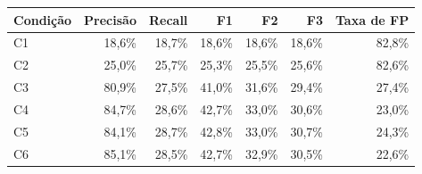 \begin{tabular}{lrrrrrr}
\hline
Condição & Precisão & Recall & F1 & F2 & F3 & Taxa de FP \\
\hline
C1 & 18,6\% & 18,7\% & 18,6\% & 18,6\% & 18,6\% & 82,8\% \\
C2 & 25,0\% & 25,7\% & 25,3\% & 25,5\% & 25,6\% & 82,6\% \\
C3 & 80,9\% & 27,5\% & 41,0\% & 31,6\% & 29,4\% & 27,4\% \\
C4 & 84,7\% & 28,6\% & 42,7\% & 33,0\% & 30,6\% & 23,0\% \\
C5 & 84,1\% & 28,7\% & 42,8\% & 33,0\% & 30,7\% & 24,3\% \\
C6 & 85,1\% & 28,5\% & 42,7\% & 32,9\% & 30,5\% & 22,6\% \\
\hline
\end{tabular}
